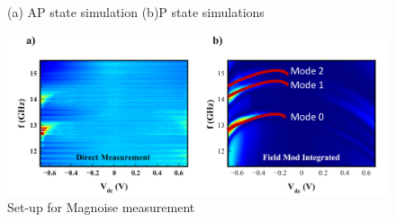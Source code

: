 \begin{figure}[!ht]
\centering
{}
\caption{(a) AP state simulation (b)P state simulations}
\end{figure}



\begin{figure}[!ht]
  \centering
  \includegraphics[width=1.0\textwidth]{fig/magnoise/magnoise2D.png}
   \caption{Set-up for Magnoise measurement}
  \label{fig:magnoise-2D}
\end{figure}




